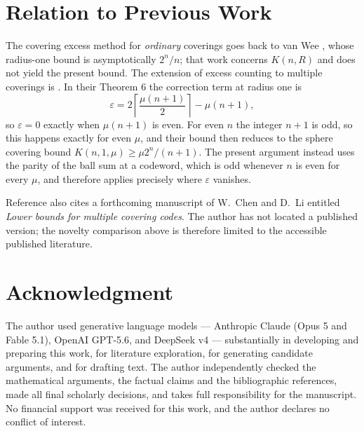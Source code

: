 \documentclass[10pt,a4paper]{article}
\begin{document}
\section{Relation to Previous Work}\label{sec-prior}

The covering excess method for \emph{ordinary} coverings goes back to van Wee
\cite{vanWee-1988}, whose radius-one bound is asymptotically $2^n/n$; that work
concerns $K(n,R)$ and does not yield the present bound. The extension of excess
counting to multiple coverings is \cite{HHKL-1993}. In their Theorem 6 the
correction term at radius one is
\[
  \varepsilon=2\left\lceil\frac{\mu(n+1)}{2}\right\rceil-\mu(n+1),
\]
so $\varepsilon=0$ exactly when $\mu(n+1)$ is even. For even $n$ the integer
$n+1$ is odd, so this happens exactly for even $\mu$, and their bound then
reduces to the sphere covering bound $K(n,1,\mu)\ge\mu 2^n/(n+1)$. The present
argument instead uses the parity of the ball sum at a codeword, which is odd
whenever $n$ is even for every $\mu$, and therefore applies precisely where
$\varepsilon$ vanishes.

Reference \cite{HHKL-1993} also cites a forthcoming manuscript of W.\ Chen and
D.\ Li entitled \emph{Lower bounds for multiple covering codes}. The author has
not located a published version; the novelty comparison above is therefore
limited to the accessible published literature.

\section*{Acknowledgment}

The author used generative language models --- Anthropic Claude (Opus 5 and
Fable 5.1), OpenAI GPT-5.6, and DeepSeek v4 --- substantially in developing and
preparing this work, for literature exploration, for generating candidate
arguments, and for drafting text. The author independently checked the
mathematical arguments, the factual claims and the bibliographic references,
made all final scholarly decisions, and takes full responsibility for the
manuscript. No financial support was received for this work, and the author
declares no conflict of interest.

\footnotesize
\end{document}
